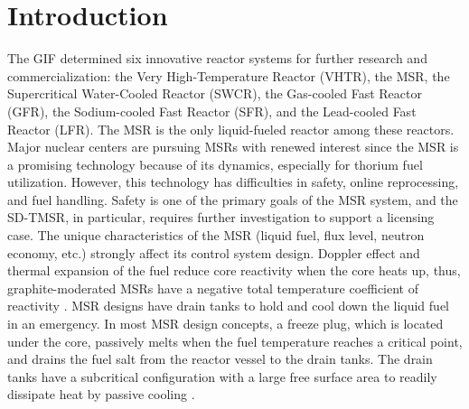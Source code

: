\section{Introduction} \label{Introduction}

The \gls{GIF} \cite{doe2002technology} determined six innovative reactor 
systems for further research and commercialization: the Very High-Temperature Reactor (VHTR), the \gls{MSR}, the 
Supercritical Water-Cooled Reactor (SWCR), the Gas-cooled Fast Reactor (GFR), 
the Sodium-cooled Fast Reactor (SFR), and the Lead-cooled Fast Reactor (LFR). 
The MSR is the only liquid-fueled reactor among these reactors. Major nuclear 
centers are pursuing MSRs with renewed interest \cite{betzler_impacts_2019, 
ashraf2020whole,betzler2016modeling,mohsin2019safety,zhang2020radiotoxicity} since
the MSR is a promising technology because of its dynamics, especially for 
thorium fuel utilization. However, this technology has difficulties in safety, 
online reprocessing, and fuel handling. Safety is one of the primary goals of 
the MSR system, and the SD-TMSR, in particular, requires further investigation to support a licensing case.
The unique characteristics of the MSR (liquid fuel, flux level, neutron economy, 
etc.) strongly affect its control system design. Doppler effect and thermal expansion of the fuel reduce
core reactivity when the core heats up, thus, graphite-moderated MSRs have 
a negative total temperature coefficient of reactivity 
\cite{ashraf2020whole,robertson_conceptual_1971,nuttin2005potential,rykhlevskii2019modeling,li_optimization_2018}.
MSR designs have drain tanks to 
hold and cool down the liquid fuel in an emergency. In most MSR design concepts, a freeze plug, which 
is located under the core, passively melts when the fuel temperature reaches a 
critical point, and drains the fuel salt from the reactor vessel to the drain 
tanks. The drain tanks have a subcritical
configuration with a large free 
surface area to readily dissipate heat by passive cooling 
\cite{elsheikh2013safety}.

